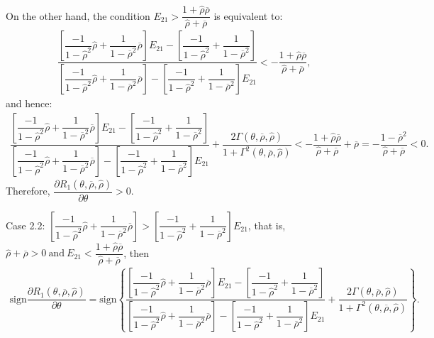 \documentclass[10pt]{article}
\begin{document}
On the other hand, the condition {\footnotesize $ E_{2 1} > \dfrac{1 + {\hat \rho} \overline{\rho}}{{\hat \rho} + \overline{\rho}} $} is equivalent to:
{\footnotesize \begin{eqnarray*}
\dfrac{\left[ \dfrac{- 1}{1 - {\hat \rho}^2} {\hat \rho} + \dfrac1{1 - \overline{\rho}^2} \overline{\rho} \right] E_{2 1} - \left[ \dfrac{- 1}{1 - {\hat \rho}^2} + \dfrac1{1 - \overline{\rho}^2} \right]}{\left[ \dfrac{- 1}{1 - {\hat \rho}^2} {\hat \rho} + \dfrac1{1 - \overline{\rho}^2} \overline{\rho} \right] - \left[ \dfrac{- 1}{1 - {\hat \rho}^2} + \dfrac1{1 - \overline{\rho}^2} \right] E_{2 1}} < - \dfrac{1 + {\hat \rho} \overline{\rho}}{{\hat \rho} + \overline{\rho}},
\end{eqnarray*}}
and hence:
{\footnotesize \begin{eqnarray*}
\dfrac{\left[ \dfrac{- 1}{1 - {\hat \rho}^2} {\hat \rho} + \dfrac1{1 - \overline{\rho}^2} \overline{\rho} \right] E_{2 1} - \left[ \dfrac{- 1}{1 - {\hat \rho}^2} + \dfrac1{1 - \overline{\rho}^2} \right]}{\left[ \dfrac{- 1}{1 - {\hat \rho}^2} {\hat \rho} + \dfrac1{1 - \overline{\rho}^2} \overline{\rho} \right] - \left[ \dfrac{- 1}{1 - {\hat \rho}^2} + \dfrac1{1 - \overline{\rho}^2} \right] E_{2 1}} + \dfrac{2 \Gamma (\theta, \overline{\rho}, {\hat \rho})}{1 + \Gamma^2 (\theta, \overline{\rho}, {\hat \rho})} < - \dfrac{1 + {\hat \rho} \overline{\rho}}{{\hat \rho} + \overline{\rho}}  + \overline{\rho} = - \dfrac{1 - \overline{\rho}^2}{{\hat \rho} + \overline{\rho}} < 0.
\end{eqnarray*}}
Therefore, {\footnotesize $ \dfrac{\partial R_1 (\theta, \overline{\rho}, {\hat \rho})}{\partial \theta} > 0 $}.

Case 2.2: {\footnotesize $ \left[ \dfrac{- 1}{1 - {\hat \rho}^2} {\hat \rho} + \dfrac1{1 - \overline{\rho}^2} \overline{\rho} \right] > \left[ \dfrac{- 1}{1 - {\hat \rho}^2} + \dfrac1{1 - \overline{\rho}^2} \right] E_{2 1} $}, that is, {\footnotesize $ {\hat \rho} + \overline{\rho} > 0 \ \text{and} \ E_{2 1} < \dfrac{1 + {\hat \rho} \overline{\rho}}{{\hat \rho} + \overline{\rho}} $}, then
{\footnotesize \begin{eqnarray*}
\text{sign} \dfrac{\partial R_1 (\theta, \overline{\rho}, {\hat \rho})}{\partial \theta} = \text{sign} \left\{ \dfrac{\left[ \dfrac{- 1}{1 - {\hat \rho}^2} {\hat \rho} + \dfrac1{1 - \overline{\rho}^2} \overline{\rho} \right] E_{2 1} - \left[ \dfrac{- 1}{1 - {\hat \rho}^2} + \dfrac1{1 - \overline{\rho}^2} \right]}{\left[ \dfrac{- 1}{1 - {\hat \rho}^2} {\hat \rho} + \dfrac1{1 - \overline{\rho}^2} \overline{\rho} \right] - \left[ \dfrac{- 1}{1 - {\hat \rho}^2} + \dfrac1{1 - \overline{\rho}^2} \right] E_{2 1}} + \dfrac{2 \Gamma (\theta, \overline{\rho}, {\hat \rho})}{1 + \Gamma^2 (\theta, \overline{\rho}, {\hat \rho})} \right\}.
\end{eqnarray*}}
\end{document}
